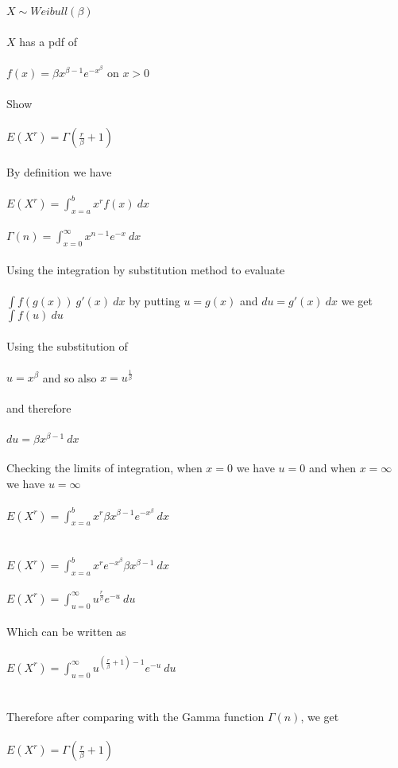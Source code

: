 \documentclass[11pt]{article}   	%
\begin{document}
$ X \sim Weibull( \beta ) $ \\
\\
$ X $ has a pdf of \\
\\
$ f(x) = \beta x^{\beta - 1} e^{-x^\beta} $ on $ x > 0 $ \\
\\
Show \\
\\
$ E(X^r ) = \Gamma (\frac{r}{\beta} + 1) $ \\
\\
By definition we have \\
\\
$ E(X^r) = \int_{ x = a }^b x^r f(x) \ dx $ \\
\\
$ \Gamma(n) = \int_{x = 0}^{\infty} x^{n-1} e^{-x} \ dx $ \\
\\
Using the integration by substitution method to evaluate \\
\\
$ \displaystyle \int f(g(x)) \ g'(x) \ dx $ by putting $ u = g(x) $ and $ du = g'(x) \ dx $ we get $ \displaystyle \int f(u) \ du $ \\
\\
Using the substitution of \\
\\
$ u = x^\beta $ and so also $ x = u^{\frac{1}{\beta}} $ \\
\\
and therefore \\
\\
$ du = \beta x^{ \beta - 1 } \ dx $ \\
\\
Checking the limits of integration, when $ x = 0 $ we have $ u = 0 $ and when $ x = \infty $ we have $ u = \infty $ \\
\\
$ E(X^r) = \displaystyle \int_{ x = a }^b x^r \beta x^{\beta - 1} e^{-x^\beta} \ dx $ \\
\\\\
$ E(X^r) = \displaystyle \int_{ x = a }^b x^r e^{-x^\beta} \beta x^{\beta - 1} \ dx $ \\
\\
$ E(X^r) = \displaystyle \int_{u = 0}^{\infty} u^{\frac{r}{\beta}} e^{-u} \ du $ \\
\\
Which can be written as \\
\\
$ E(X^r) = \displaystyle \int_{u = 0}^{\infty} u^{(\frac{r}{\beta} + 1) - 1} e^{-u} \ du $ \\
\\\\
Therefore after comparing with the Gamma function $ \Gamma(n) $, we get \\
\\
$ E(X^r) = \Gamma( \frac{r}{\beta} + 1) $ \\
\\
\end{document}
